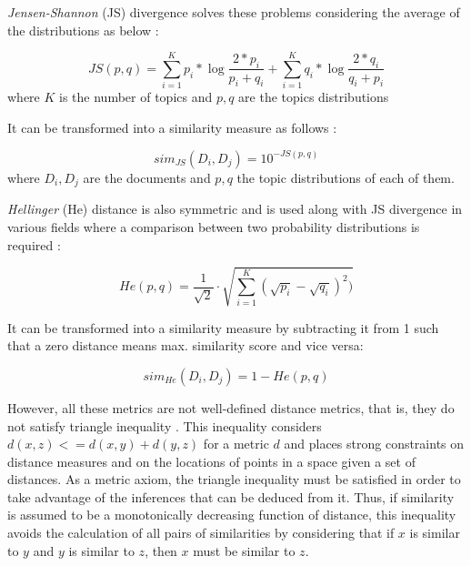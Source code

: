 \textit{Jensen-Shannon} (JS) divergence \citep{Rao1982,Lin1991} solves these problems considering the average of the distributions as below \citep{Celikyilmaz2010}:

\begin{equation}
JS(p,q) = \sum\limits_{i=1}^K p_{i}*\log \frac{2*p_{i}}{p_{i}+q_{i}}  +  \sum\limits_{i=1}^K q_{i}*\log \frac{2*q_{i}}{q_{i}+p_{i}}
\label{eq:jsdivergence}
\end{equation}
where  $K$ is the number of topics and $p,q$ are the topics distributions

It can be transformed into a similarity measure as follows \citep{Dagan1998} :

\begin{equation}
sim_{JS}(D_i , D_j) = 10^{- JS(p,q)}
\label{eq:simjs}
\end{equation}
where  $D_i,D_j$ are the documents and $p,q$ the topic distributions of each of them.


\textit{Hellinger} (He) distance is also symmetric and is used along with JS divergence in various fields where a comparison between two probability distributions is required \citep{Blei2007a,Hall2008,Boyd-Graber2010}:

\begin{equation}
	He(p, q) = \frac{1}{\sqrt{2}}\cdot\sqrt{\sum\limits_{i=1}^K (\sqrt{p_i} - \sqrt{q_i})^2)}
	\label{eq:hedistance}
\end{equation}

It can be transformed into a similarity measure by subtracting it from 1 \citep{Rus2013} such that a zero distance means max. similarity score and vice versa:

\begin{equation}
	sim_{He}(D_i, D_j) = 1 - He(p,q)
	\label{eq:simhe}
\end{equation}

However, all these metrics are not well-defined distance metrics, that is, they do not satisfy triangle inequality \citep{Charikar2002}. This inequality considers $d(x, z) <= d(x, y) + d(y, z)$ for a metric $d$ \citep{Griffiths2007} and places strong constraints on distance measures and on the locations of points in a space given a set of distances. As a metric axiom, the triangle inequality must be satisfied in order to take advantage of the inferences that can be deduced from it. Thus, if similarity is assumed to be a monotonically decreasing function of distance, this inequality avoids the calculation of all pairs of similarities by considering that if $x$ is similar to $y$ and $y$ is similar to $z$, then $x$ must be similar to $z$. 

